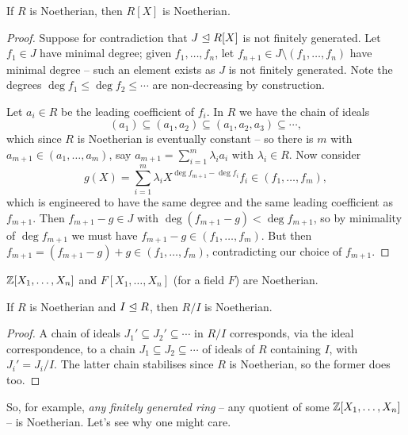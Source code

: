\documentclass[a4paper]{scrartcl}
\begin{document}
\begin{theorem}
	If $R$ is Noetherian, then $R[X]$ is Noetherian.
\end{theorem}
\begin{proof}
	Suppose for contradiction that $J \trianglelefteq R[X]$ is not finitely generated. Let $f_1 \in J$ have minimal degree; given $f_1, \dots, f_n$, let $f_{n + 1} \in J \setminus (f_1, \dots, f_n)$ have minimal degree -- such an element exists as $J$ is not finitely generated. Note the degrees $\deg f_1 \leq \deg f_2 \leq \cdots$ are non-decreasing by construction.

	Let $a_i \in R$ be the leading coefficient of $f_i$. In $R$ we have the chain of ideals
	$$
	(a_1) \subseteq (a_1, a_2) \subseteq (a_1, a_2, a_3) \subseteq \cdots,
	$$
	which since $R$ is Noetherian is eventually constant -- so there is $m$ with $a_{m + 1} \in (a_1, \dots, a_m)$, say $a_{m + 1} = \sum_{i = 1}^{m} \lambda_i a_i$ with $\lambda_i \in R$. Now consider
	$$
	g(X) = \sum_{i = 1}^{m} \lambda_i X^{\deg f_{m + 1} - \deg f_i} f_i \in (f_1, \dots, f_m),
	$$
	which is engineered to have the same degree and the same leading coefficient as $f_{m + 1}$. Then $f_{m+1} - g \in J$ with $\deg(f_{m + 1} - g) < \deg f_{m + 1}$, so by minimality of $\deg f_{m+1}$ we must have $f_{m + 1} - g \in (f_1, \dots, f_m)$. But then $f_{m + 1} = (f_{m+1} - g) + g \in (f_1, \dots, f_m)$, contradicting our choice of $f_{m + 1}$.
\end{proof}

\begin{corollary}
	$\mathbb{Z}[X_1, \dots, X_n]$ and $F[X_1, \dots, X_n]$ (for a field $F$) are Noetherian.
\end{corollary}

\begin{lemma}
	If $R$ is Noetherian and $I \trianglelefteq R$, then $R/I$ is Noetherian.
\end{lemma}
\begin{proof}
	A chain of ideals $J_1' \subseteq J_2' \subseteq \cdots$ in $R/I$ corresponds, via the ideal correspondence, to a chain $J_1 \subseteq J_2 \subseteq \cdots$ of ideals of $R$ containing $I$, with $J_i' = J_i/I$. The latter chain stabilises since $R$ is Noetherian, so the former does too.
\end{proof}

So, for example, \emph{any finitely generated ring} -- any quotient of some $\mathbb{Z}[X_1, \dots, X_n]$ -- is Noetherian. Let's see why one might care.
\end{document}
